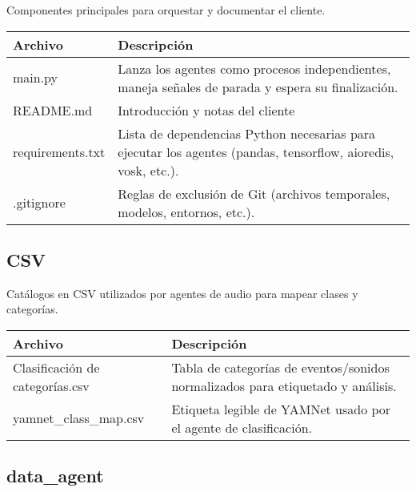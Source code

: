 Componentes principales para orquestar y documentar el cliente.

\begin{table}[H]
  \doublespacing
  \begin{tabularx}{\textwidth}{l X}
    \hline
    \textbf{Archivo} & \textbf{Descripción}                                                                       \\
    \hline
    main.py          &
    Lanza los agentes como procesos independientes, maneja señales de parada y espera su finalización.            \\
    README.md        &
    Introducción y notas del cliente                                                                              \\
    requirements.txt &
    Lista de dependencias Python necesarias para ejecutar los agentes (pandas, tensorflow, aioredis, vosk, etc.). \\
    .gitignore       &
    Reglas de exclusión de Git (archivos temporales, modelos, entornos, etc.).                                    \\
    \hline
  \end{tabularx}
\end{table}

\subsection*{CSV}

Catálogos en CSV utilizados por agentes de audio para mapear clases y categorías.

\begin{table}[H]
  \doublespacing
  \begin{tabularx}{\textwidth}{l X}
    \hline
    \textbf{Archivo}                & \textbf{Descripción}                          \\
    \hline
    Clasificación de categorías.csv &
    Tabla de categorías de eventos/sonidos normalizados para etiquetado y análisis. \\
    yamnet\_class\_map.csv          &
    Etiqueta legible de YAMNet usado por el agente de clasificación.                \\
    \hline
  \end{tabularx}
\end{table}

\subsection*{data\_agent}


